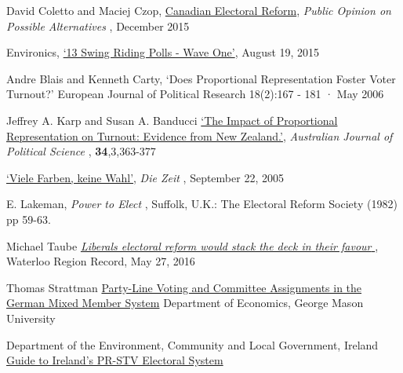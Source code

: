 \documentclass[DIV=calc, paper=a4, fontsize=11pt, twocolumn]{scrartcl}	 %
\begin{document}
\begin{thebibliography}{99} %

David Coletto and Maciej Czop,
{\color{blue} \href{https://d3n8a8pro7vhmx.cloudfront.net/broadbent/pages/4770/attachments/original/1448994262/Canadian_Electoral_Reform_-_Report.pdf?1448994262}{Canadian Electoral Reform}},
{\emph{Public Opinion on Possible Alternatives} }, December 2015

Environics,
{\color{blue} \href{http://www.votetogether.ca/pages/localpolling/}{`13 Swing Riding Polls - Wave One'}}, August 19, 2015

Andre Blais and Kenneth Carty, 
`Does Proportional Representation Foster Voter Turnout?'
European Journal of Political Research 18(2):167 - 181 · May 2006

Jeffrey A. Karp and Susan A. Banducci
{\color{blue} \href{http://www.jkarp.com/pdf/ajps_1999.pdf}{`The Impact of Proportional Representation on Turnout: Evidence from New Zealand.'}},
{ \emph{Australian Journal of Political Science} }, \textbf{34},3,363-377

  
{\color{blue} \href{http://www.zeit.de/2005/39/Wahl\_paradox}{`Viele Farben, keine Wahl'}},
 { \emph{Die Zeit} }, September 22, 2005

E. Lakeman,
{ \emph{Power to Elect} }, Suffolk, U.K.: The Electoral Reform Society (1982) pp 59-63.

 Michael Taube
{\color{blue} \href{http://www.therecord.com/opinion-story/6692466-liberals-electoral-reform-would-stack-the-deck-in-their-favour/}{ \emph{Liberals electoral reform would stack the deck in their favour} } },
Waterloo Region Record, May 27, 2016 

Thomas Strattman
{\color{blue} \href{http://www.gmu.edu/centers/publicchoice/faculty%20pages/stratmann/vitae%20files/bunddev.pdf}{Party-Line Voting and Committee Assignments in the German Mixed Member System}}
Department of Economics, George Mason University

Department of the Environment, Community and Local Government, Ireland
{\color{blue} \href{https://www.laois.ie/wp-content/uploads/Guide-to-Irelands-Electoral-System-2.pdf}{Guide to Ireland’s PR-STV Electoral System}}
 
\end{thebibliography}
\end{document}
